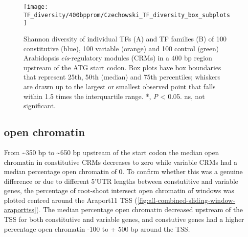 \documentclass[../main.tex]{subfiles}
\begin{document}
\begin{figure}[hbt!]
	\begin{center}
		\capstart
		\texttt{[image: TF\_diversity/400bpprom/Czechowski\_TF\_diversity\_box\_subplots]}
		\caption{
			Shannon diversity of individual TFs (A) and TF families (B) of 100 constitutive (blue), 100 variable (orange) and 100 control (green) Arabidopsis \textit{cis}\hyp{}regulatory modules (CRMs) in a 400 bp region upstream of the ATG start codon.
			Box plots have box boundaries that represent 25th, 50th (median) and 75th percentiles; whiskers are drawn up to the largest or smallest observed point that falls within 1.5 times the interquartile range.
			\label{fig:tf-diversity-400bpprom}
			*, \textit{P} \textless{} 0.05. ns, not significant.
		}
	\end{center}
\end{figure}

\subsection{open chromatin}

From \textasciitilde{}350 bp to \textasciitilde{}650 bp upstream of the start codon the median open chromatin in constitutive CRMs decreases to zero while variable CRMs had a median percentage open chromatin of 0.
To confirm whether this was a genuine difference or due to different 5'UTR lengths between constutitive and variable genes, the percentage of root\hyp{}shoot intersect open chromatin of windows was plotted centred around the Araport11 TSS (\autoref{fig:all-combined-sliding-window-araporttss}).
The median percentage open chromatin decreased upstream of the TSS for both constitutive and variable genes, and constutive genes had a higher percentage open chromatin -100 to + 500 bp around the TSS.%
\end{document}
